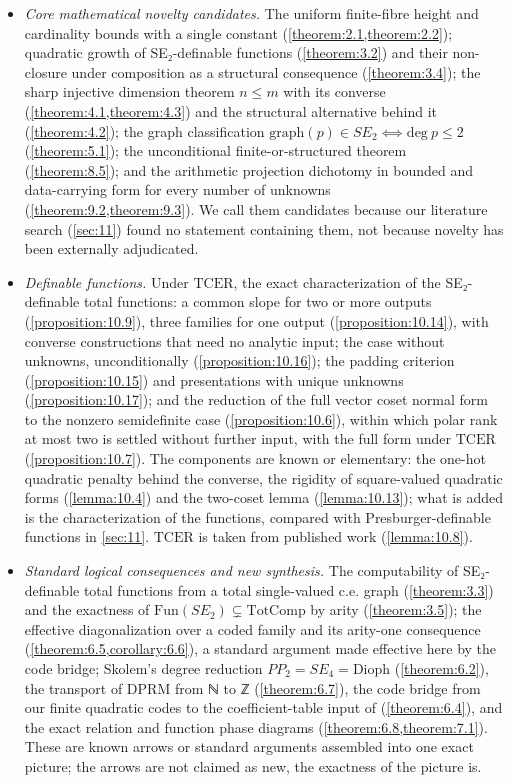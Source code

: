 \begin{itemize}
\item \emph{Core mathematical novelty candidates.} The uniform finite-fibre height and cardinality bounds with a single constant (\cref{theorem:2.1,theorem:2.2}); quadratic growth of SE₂-definable functions (\cref{theorem:3.2}) and their non-closure under composition as a structural consequence (\cref{theorem:3.4}); the sharp injective dimension theorem $n ≤ m$ with its converse (\cref{theorem:4.1,theorem:4.3}) and the structural alternative behind it (\cref{theorem:4.2}); the graph classification $\mathrm{graph}(p) ∈ SE_{2} ⟺ \mathrm{deg}\ p ≤ 2$ (\cref{theorem:5.1}); the unconditional finite-or-structured theorem (\cref{theorem:8.5}); and the arithmetic projection dichotomy in bounded and data-carrying form for every number of unknowns (\cref{theorem:9.2,theorem:9.3}). We call them candidates because our literature search (\cref{sec:11}) found no statement containing them, not because novelty has been externally adjudicated.
\item \emph{Definable functions.} Under $\mathrm{TCER}$, the exact characterization of the SE₂-definable total functions: a common slope for two or more outputs (\cref{proposition:10.9}), three families for one output (\cref{proposition:10.14}), with converse constructions that need no analytic input; the case without unknowns, unconditionally (\cref{proposition:10.16}); the padding criterion (\cref{proposition:10.15}) and presentations with unique unknowns (\cref{proposition:10.17}); and the reduction of the full vector coset normal form to the nonzero semidefinite case (\cref{proposition:10.6}), within which polar rank at most two is settled without further input, with the full form under $\mathrm{TCER}$ (\cref{proposition:10.7}). The components are known or elementary: the one-hot quadratic penalty behind the converse, the rigidity of square-valued quadratic forms (\cref{lemma:10.4}) and the two-coset lemma (\cref{lemma:10.13}); what is added is the characterization of the functions, compared with Presburger-definable functions in \cref{sec:11}. $\mathrm{TCER}$ is taken from published work (\cref{lemma:10.8}).
\item \emph{Standard logical consequences and new synthesis.} The computability of SE₂-definable total functions from a total single-valued c.e. graph (\cref{theorem:3.3}) and the exactness of $\mathrm{Fun}(SE_{2}) ⊊ \mathrm{TotComp}$ by arity (\cref{theorem:3.5}); the effective diagonalization over a coded family and its arity-one consequence (\cref{theorem:6.5,corollary:6.6}), a standard argument made effective here by the code bridge; Skolem's degree reduction $PP_{2} = SE_{4} = \mathrm{Dioph}$ (\cref{theorem:6.2}), the transport of DPRM from ℕ to ℤ (\cref{theorem:6.7}), the code bridge from our finite quadratic codes to the coefficient-table input of \cite{GS04} (\cref{theorem:6.4}), and the exact relation and function phase diagrams (\cref{theorem:6.8,theorem:7.1}). These are known arrows or standard arguments assembled into one exact picture; the arrows are not claimed as new, the exactness of the picture is.

\end{itemize}
